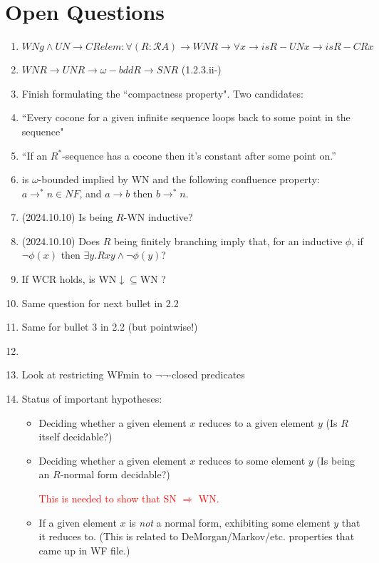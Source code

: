 \documentclass{scrartcl}
\begin{document}
\section{Open Questions }
\begin{enumerate}
  \item
     \[ WNg \land UN \to CRelem :
     \forall (R : \mathscr{R} A) \to WN R \to \forall x \to is R -UN x \to is R -CR x \]
     \item $WN R \to UN R \to \omega-bdd R \to SN R$ (1.2.3.ii-)
      \item Finish formulating the ``compactness property".  Two candidates:
       \item ``Every cocone for a given infinite sequence loops back to some point in the sequence"
       \item ``If an $R^*$-sequence has a cocone then it's constant after some point on.''
       \item is $\omega$-bounded implied by WN and the following confluence property:
       $a \to^* n \in NF$, and $a \to b$ then $b \to^* n $.
  \item (2024.10.10) Is being $R$-WN inductive?
  \item (2024.10.10) Does $R$ being finitely branching imply
   that, for an inductive $\phi$, if $\lnot \phi(x)$ then
   $\exists y. Rxy \land \lnot \phi(y)$?

  \item If WCR holds, is WN$\downarrow\subseteq$WN ?
  \item Same question for next bullet in 2.2
  \item Same for bullet 3 in 2.2 (but pointwise!)
  \item \item Look at restricting WFmin to $\lnot\lnot$-closed predicates
  \item Status of important hypotheses:
    \begin{itemize}
      \item Deciding whether a given element $x$ reduces to a given element $y$
      (Is $R$ itself decidable?)
      \item Deciding whether a given element $x$ reduces to some element $y$
      (Is being an $R$-normal form decidable?)

      {\textcolor{red}{This is needed to show that SN $\Rightarrow$ WN.}}

      \item If a given element $x$ is \emph{not} a normal form,
      exhibiting some element $y$ that it reduces to.
      (This is related to DeMorgan/Markov/etc. properties that came up in WF file.)


\end{itemize}
\end{enumerate}
\end{document}
